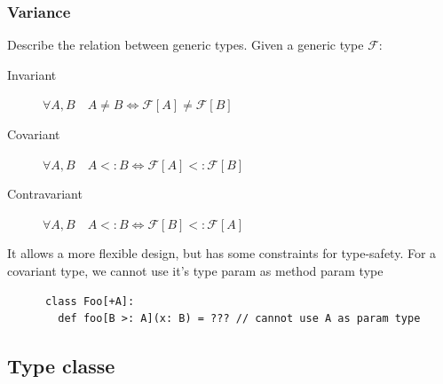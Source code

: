 \begin{frame}[fragile]
  \frametitle{Variance}

  \begin{definition}
    Describe the relation between generic types. Given a generic type \(\mathcal{F}\):
    \begin{description}
      \item[Invariant] \(\forall A,B\quad A \neq B \Leftrightarrow \mathcal{F}[A] \neq \mathcal{F}[B]\)
      \item[Covariant] \(\forall A,B\quad A <: B \Leftrightarrow \mathcal{F}[A] <: \mathcal{F}[B]\)
      \item[Contravariant] \(\forall A,B\quad A <: B \Leftrightarrow \mathcal{F}[B] <: \mathcal{F}[A]\)
    \end{description}
  \end{definition}


  It allows a more flexible design, but has some constraints for type-safety. For a covariant type, we cannot use it's type param as method param type

  \begin{example}
    \begin{lstlisting}
      class Foo[+A]:
        def foo[B >: A](x: B) = ??? // cannot use A as param type
    \end{lstlisting}
  \end{example}
\end{frame}

\subsection{Type classe}

